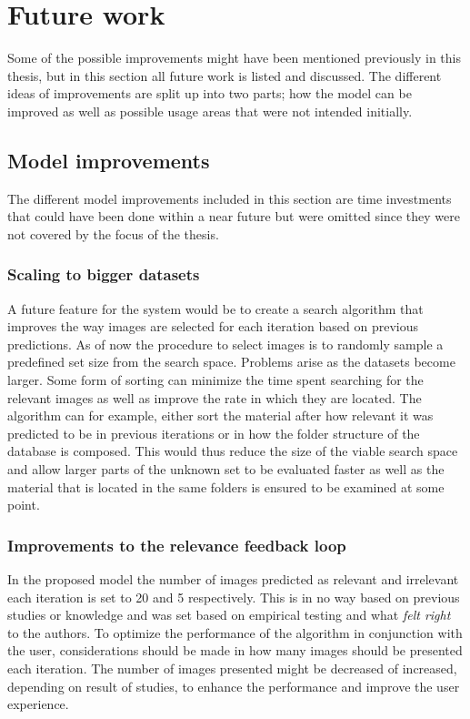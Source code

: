\section{Future work}
\label{sec:concl:future}
Some of the possible improvements might have been mentioned previously in this thesis, but in this section all future work is listed and discussed.
The different ideas of improvements are split up into two parts; how the model can be improved as well as possible usage areas that were not intended initially.

\subsection{Model improvements}
\label{sec:conc:future:model}
The different model improvements included in this section are time investments that could have been done within a near future but were omitted since they were not covered by the focus of the thesis.

\subsubsection{Scaling to bigger datasets}
\label{sec:conc:future:model:data}

A future feature for the system would be to create a search algorithm that improves the way images are selected for each iteration based on previous predictions.
As of now the procedure to select images is to randomly sample a predefined set size from the search space. 
Problems arise as the datasets become larger. Some form of sorting can minimize the time spent searching for the relevant images as well as improve the rate in which they are located. 
The algorithm can for example, either sort the material after how relevant it was predicted to be in previous iterations or in how the folder structure of the database is composed. This would thus reduce the size of the viable search space and allow larger parts of the unknown set to be evaluated faster as well as the material that is located in the same folders is ensured to be examined at some point.

\subsubsection{Improvements to the relevance feedback loop}
\label{sec:conc:future:model:rf}
In the proposed model the number of images predicted as relevant and irrelevant each iteration is set to 20 and 5 respectively. This is in no way based on previous studies or knowledge and was set based on empirical testing and what \emph{felt right} to the authors. To optimize the performance of the algorithm in conjunction with the user, considerations should be made in how many images should be presented each iteration. The number of images presented might be decreased of increased, depending on result of studies, to enhance the performance and improve the user experience.

